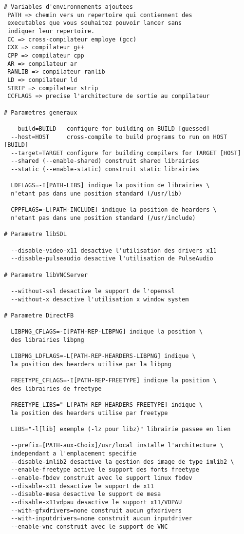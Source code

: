 \begin{lstlisting}
# Variables d'environnements ajoutees
 PATH => chemin vers un repertoire qui contiennent des
 executables que vous souhaitez pouvoir lancer sans
 indiquer leur repertoire.
 CC => cross-compilateur employe (gcc)
 CXX => compilateur g++
 CPP => compilateur cpp
 AR => compilateur ar
 RANLIB => compilateur ranlib
 LD => compilateur ld
 STRIP => compilateur strip
 CCFLAGS => precise l'architecture de sortie au compilateur

# Parametres generaux
  
  --build=BUILD   configure for building on BUILD [guessed]
  --host=HOST     cross-compile to build programs to run on HOST [BUILD]
  --target=TARGET configure for building compilers for TARGET [HOST]
  --shared (--enable-shared) construit shared librairies
  --static (--enable-static) construit static librairies
 
  LDFLAGS=-I[PATH-LIBS] indique la position de librairies \ 
  n'etant pas dans une position standard (/usr/lib)
  
  CPPFLAGS=-L[PATH-INCLUDE] indique la position de hearders \ 
  n'etant pas dans une position standard (/usr/include)
  
# Parametre libSDL

  --disable-video-x11 desactive l'utilisation des drivers x11 
  --disable-pulseaudio desactive l'utilisation de PulseAudio
  
# Parametre libVNCServer  

  --without-ssl desactive le support de l'openssl
  --without-x desactive l'utilisation x window system
  
# Parametre DirectFB 

  LIBPNG_CFLAGS=-I[PATH-REP-LIBPNG] indique la position \ 
  des librairies libpng
  
  LIBPNG_LDFLAGS=-L[PATH-REP-HEARDERS-LIBPNG] indique \ 
  la position des hearders utilise par la libpng
  
  FREETYPE_CFLAGS=-I[PATH-REP-FREETYPE] indique la position \ 
  des librairies de freetype
 
  FREETYPE_LIBS="-L[PATH-REP-HEARDERS-FREETYPE] indique \ 
  la position des hearders utilise par freetype
 
  LIBS="-l[lib] exemple (-lz pour libz)" librairie passee en lien
  
  --prefix=[PATH-aux-Choix]/usr/local installe l'architecture \ 
  independant a l'emplacement specifie
  --disable-imlib2 desactive la gestion des image de type imlib2 \
  --enable-freetype active le support des fonts freetype 
  --enable-fbdev construit avec le support linux fbdev
  --disable-x11 desactive le support de x11
  --disable-mesa desactive le support de mesa
  --disable-x11vdpau desactive le support x11/VDPAU
  --with-gfxdrivers=none construit aucun gfxdrivers
  --with-inputdrivers=none construit aucun inputdriver
  --enable-vnc construit avec le support de VNC
  
\end{lstlisting}

